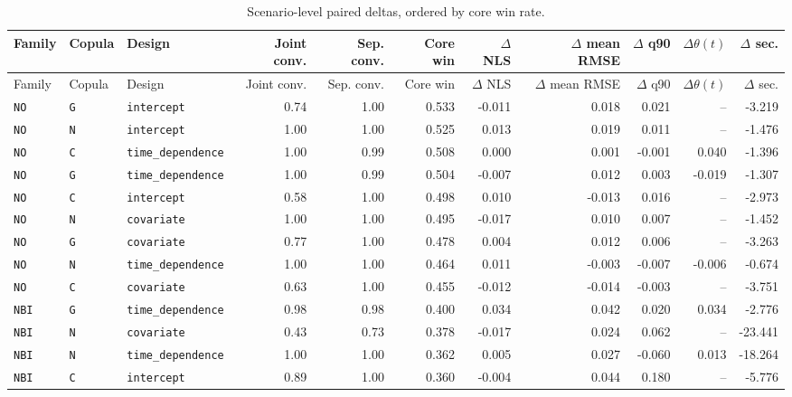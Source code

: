 \documentclass[11pt]{article}
\begin{document}
\begin{landscape}
\begin{longtable}{lllrrrrrrrr}
\caption{Scenario-level paired deltas, ordered by core win rate.}
\label{tab:scenario-deltas}\\
\toprule
Family & Copula & Design & Joint conv. & Sep. conv. & Core win &
\(\Delta\) NLS & \(\Delta\) mean RMSE & \(\Delta\) q90 &
\(\Delta\theta(t)\) & \(\Delta\) sec. \\
\midrule
\endfirsthead
\toprule
Family & Copula & Design & Joint conv. & Sep. conv. & Core win &
\(\Delta\) NLS & \(\Delta\) mean RMSE & \(\Delta\) q90 &
\(\Delta\theta(t)\) & \(\Delta\) sec. \\
\midrule
\endhead
\texttt{NO} & \texttt{G} & \texttt{intercept} & 0.74 & 1.00 & 0.533 & -0.011 & 0.018 & 0.021 & -- & -3.219 \\
\texttt{NO} & \texttt{N} & \texttt{intercept} & 1.00 & 1.00 & 0.525 & 0.013 & 0.019 & 0.011 & -- & -1.476 \\
\texttt{NO} & \texttt{C} & \texttt{time\_dependence} & 1.00 & 0.99 & 0.508 & 0.000 & 0.001 & -0.001 & 0.040 & -1.396 \\
\texttt{NO} & \texttt{G} & \texttt{time\_dependence} & 1.00 & 0.99 & 0.504 & -0.007 & 0.012 & 0.003 & -0.019 & -1.307 \\
\texttt{NO} & \texttt{C} & \texttt{intercept} & 0.58 & 1.00 & 0.498 & 0.010 & -0.013 & 0.016 & -- & -2.973 \\
\texttt{NO} & \texttt{N} & \texttt{covariate} & 1.00 & 1.00 & 0.495 & -0.017 & 0.010 & 0.007 & -- & -1.452 \\
\texttt{NO} & \texttt{G} & \texttt{covariate} & 0.77 & 1.00 & 0.478 & 0.004 & 0.012 & 0.006 & -- & -3.263 \\
\texttt{NO} & \texttt{N} & \texttt{time\_dependence} & 1.00 & 1.00 & 0.464 & 0.011 & -0.003 & -0.007 & -0.006 & -0.674 \\
\texttt{NO} & \texttt{C} & \texttt{covariate} & 0.63 & 1.00 & 0.455 & -0.012 & -0.014 & -0.003 & -- & -3.751 \\
\texttt{NBI} & \texttt{G} & \texttt{time\_dependence} & 0.98 & 0.98 & 0.400 & 0.034 & 0.042 & 0.020 & 0.034 & -2.776 \\
\texttt{NBI} & \texttt{N} & \texttt{covariate} & 0.43 & 0.73 & 0.378 & -0.017 & 0.024 & 0.062 & -- & -23.441 \\
\texttt{NBI} & \texttt{N} & \texttt{time\_dependence} & 1.00 & 1.00 & 0.362 & 0.005 & 0.027 & -0.060 & 0.013 & -18.264 \\
\texttt{NBI} & \texttt{C} & \texttt{intercept} & 0.89 & 1.00 & 0.360 & -0.004 & 0.044 & 0.180 & -- & -5.776 \\

\end{longtable}
\end{landscape}
\end{document}
